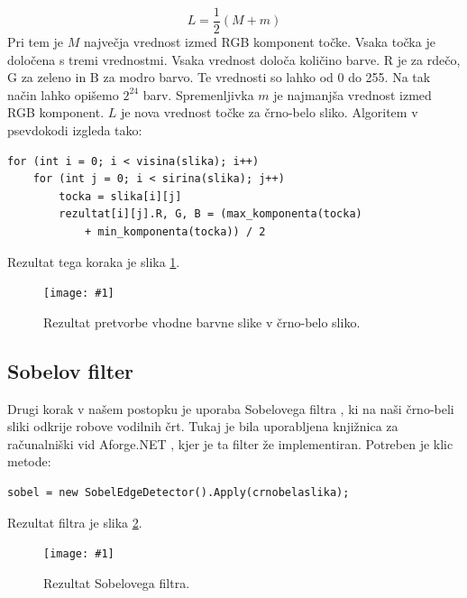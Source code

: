 \documentclass[oneside, a4paper, 12pt]{book}
\newcommand{\slika}[3]{
	\begin{figure}
	\begin{center}
	\texttt{[image: \#1]}
	\end{center}
	\vspace{-20pt}
	\caption{#2}
	\label{#3}
	\end{figure}
}
\begin{document}
\begin{equation}
L=\dfrac{1}{2}(M+m)
\label{eq:bw}
\end{equation}
Pri tem je $M$ največja vrednost izmed RGB \cite{RGB} komponent točke. 
Vsaka točka je določena s tremi vrednostmi. Vsaka vrednost določa 
količino barve. R je za rdečo, G za zeleno in B za modro barvo. Te 
vrednosti so lahko od 0 do 255. Na tak način lahko opišemo $2^{24}$ 
barv. Spremenljivka $m$ je najmanjša vrednost izmed RGB komponent. 
$L$ je nova vrednost točke za črno-belo sliko. Algoritem v psevdokodi 
izgleda tako:
\begin{samepage}
\begin{verbatim}
for (int i = 0; i < visina(slika); i++)
    for (int j = 0; i < sirina(slika); j++)
	    tocka = slika[i][j]
	    rezultat[i][j].R, G, B = (max_komponenta(tocka) 
	        + min_komponenta(tocka)) / 2
\end{verbatim}
\end{samepage}
Rezultat tega koraka je slika \ref{pic:bw}.



\slika{slike/crno-bela-slika.jpg}{Rezultat pretvorbe vhodne barvne 
slike v črno-belo sliko.}{pic:bw}

\subsection{Sobelov filter}
\label{ch:sobel}
Drugi korak v našem postopku je uporaba Sobelovega filtra 
\cite{sobel-wiki}, ki na naši črno-beli sliki odkrije robove 
vodilnih črt. Tukaj je bila uporabljena knjižnica za računalniški 
vid Aforge.NET \cite{sobel}, kjer je ta filter že implementiran. Potreben 
je klic metode:
\begin{samepage}
\begin{verbatim}
sobel = new SobelEdgeDetector().Apply(crnobelaslika);
\end{verbatim}
\end{samepage}
Rezultat filtra je slika \ref{pic:sobel}.

\slika{slike/sobel.jpg}{Rezultat Sobelovega filtra.}{pic:sobel}
\end{document}
